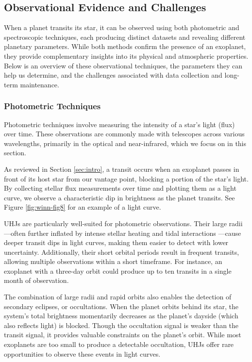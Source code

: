 \documentclass[oneside,12pt]{amsart}
\numberwithin{page}{section}
\begin{document}
\subsection{Observational Evidence and Challenges}\label{sec:obs}

When a planet transits its star, it can be observed using both photometric and spectroscopic techniques, each producing distinct datasets and revealing different planetary parameters. While both methods confirm the presence of an exoplanet, they provide complementary insights into its physical and atmospheric properties. Below is an overview of these observational techniques, the parameters they can help us determine, and the challenges associated with data collection and long-term maintenance.

\subsubsection{Photometric Techniques}\label{sec:obs-photo}

Photometric techniques involve measuring the intensity of a star’s light (flux) over time. These observations are commonly made with telescopes across various wavelengths, primarily in the optical and near-infrared, which we focus on in this section.

As reviewed in Section \ref{sec:intro}, a transit occurs when an exoplanet passes in front of its host star from our vantage point, blocking a portion of the star’s light. By collecting stellar flux measurements over time and plotting them as a light curve, we observe a characteristic dip in brightness as the planet transits. See Figure \ref{fig:winn-fig8} for an example of a light curve.

UHJs are particularly well-suited for photometric observations. Their large radii—often further inflated by intense stellar heating and tidal interactions \citep{ogilvie2014tidal}—cause deeper transit dips in light curves, making them easier to detect with lower uncertainty. Additionally, their short orbital periods result in frequent transits, allowing multiple observations within a short timeframe. For instance, an exoplanet with a three-day orbit could produce up to ten transits in a single month of observation.

The combination of large radii and rapid orbits also enables the detection of secondary eclipses, or occultations. When the planet orbits behind its star, the system’s total brightness momentarily decreases as the planet’s dayside (which also reflects light) is blocked. Though the occultation signal is weaker than the transit signal, it provides valuable constraints on the planet’s orbit. While most exoplanets are too small to produce a detectable occultation, UHJs offer rare opportunities to observe these events in light curves.
\end{document}
